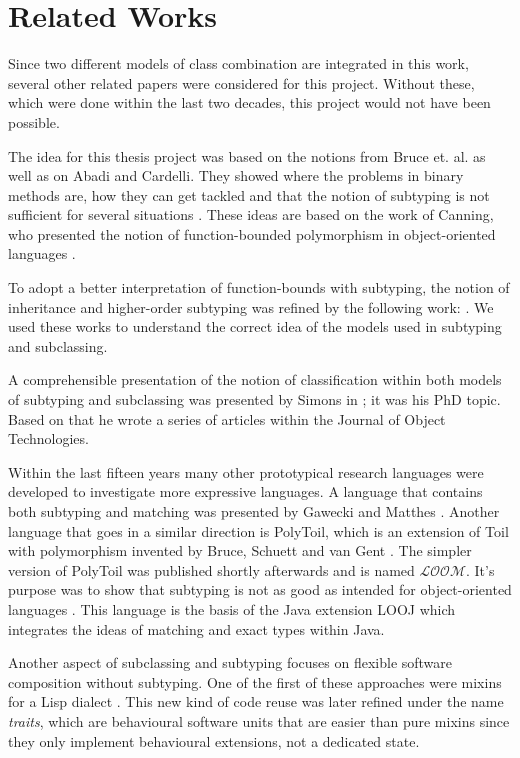\section{Related Works}
Since two different models of class combination are integrated in this
work, several other related papers were considered for this project.
Without these, which were done within the last two decades, this project would 
not have been possible.

The idea for this thesis project was based on the notions from Bruce et. al. as
well as on Abadi and Cardelli. They showed where the
problems in binary methods are, how they can get tackled
and that the notion of subtyping is not sufficient for several
situations \cite{bruce_binary_1995,abadi_subtyping_1996}. These ideas are
based on the work of Canning, who presented the notion of function-bounded
polymorphism in object-oriented languages \cite{canning_f-bounded_1989}.

To adopt a better interpretation of function-bounds
with subtyping, the notion of inheritance and
higher-order subtyping was refined by the following work:
\cite{steffen_higher-order_1994,cook_inheritance_1990,taivalsaari_notion_1996}.
We used these works to understand the correct idea of the models used
in subtyping and subclassing.

A comprehensible presentation of the notion of classification within
both models of subtyping and subclassing was presented by Simons in
\cite{simons_theory_2002-2}; it was his PhD topic. Based on that he
wrote a series of articles within the Journal of Object Technologies.

Within the last fifteen years many other prototypical research
languages were developed to investigate more expressive languages. A
language that contains both subtyping and matching was presented
by Gawecki and Matthes \cite{gawecki_tool:_1995}. Another language
that goes in a similar direction is PolyToil, which is an extension
of Toil with polymorphism invented by Bruce, Schuett and van Gent
\cite{bruce_polytoil:_1995}. The simpler version of PolyToil was published
shortly afterwards and is named $\mathcal{LOOM}$. It's purpose was
to show that subtyping is not as good as intended for object-oriented
languages \cite{bruce_subtyping_1997}. This language is the basis of
the Java extension LOOJ which integrates the ideas of matching and exact
types within Java.

Another aspect of subclassing and subtyping focuses on
flexible software composition without subtyping. One of
the first of these approaches were mixins for a Lisp dialect
\cite{bracha_mixin-based_1990}. This new kind of code reuse was later
refined under the name \emph{traits}, which are behavioural software
units \cite{schaerli_traits:_2003,ducasse_traits:_2006} that are easier
than pure mixins since they only implement behavioural extensions,
not a dedicated state.

